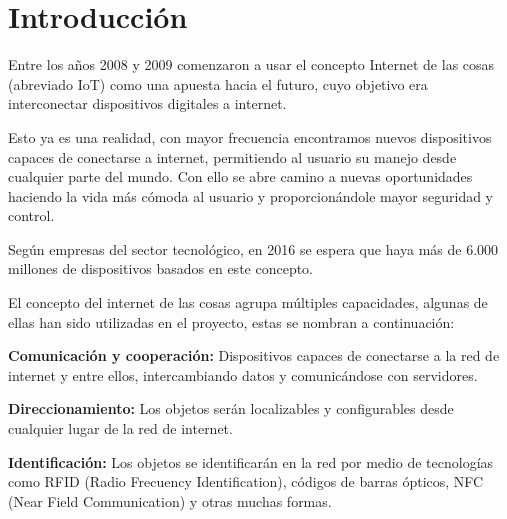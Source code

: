 
\cleardoublepage


\chapter{Introducción}
\label{makereference}

Entre los años 2008 y 2009 comenzaron a usar el concepto Internet de las cosas (abreviado IoT) como una apuesta hacia el futuro, cuyo objetivo era interconectar dispositivos digitales a internet.

Esto ya es una realidad, con mayor frecuencia encontramos nuevos dispositivos capaces de conectarse a internet, permitiendo al usuario su manejo desde cualquier parte del mundo. Con ello se abre camino a nuevas oportunidades haciendo la vida más cómoda al usuario y proporcionándole mayor seguridad y control.

Según empresas del sector tecnológico, en 2016 se espera que haya más de 6.000 millones de dispositivos basados en este concepto.

El concepto del internet de las cosas agrupa múltiples capacidades, algunas de ellas han sido utilizadas en el proyecto, estas se nombran a continuación:

\textbf{Comunicación y cooperación:} Dispositivos capaces de conectarse a la red de internet y entre ellos, intercambiando datos y comunicándose con servidores.

\textbf{Direccionamiento:} Los objetos serán localizables y configurables desde cualquier lugar de la red de internet.

\textbf{Identificación:} Los objetos se identificarán en la red por medio de tecnologías como RFID (Radio Frecuency Identification), códigos de barras ópticos, NFC (Near Field Communication) y otras muchas formas.


